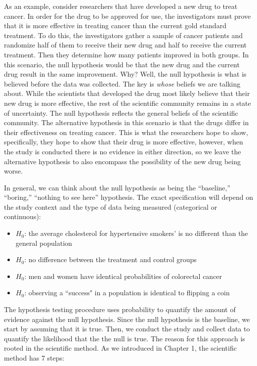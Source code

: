 \documentclass[
]{book}
\providecommand{\tightlist}{%
  \setlength{\itemsep}{0pt}\setlength{\parskip}{0pt}}
\theoremstyle{definition}
\theoremstyle{definition}
\theoremstyle{definition}
\theoremstyle{remark}
\begin{document}
As an example, consider researchers that have developed a new drug to treat cancer. In order for the drug to be approved for use, the investigators must prove that it is more effective in treating cancer than the current gold standard treatment. To do this, the investigators gather a sample of cancer patients and randomize half of them to receive their new drug and half to receive the current treatment. Then they determine how many patients improved in both groups. In this scenario, the null hypothesis would be that the new drug and the current drug result in the same improvement. Why? Well, the null hypothesis is what is believed before the data was collected. The key is \emph{whose} beliefs we are talking about. While the scientists that developed the drug most likely believe that their new drug is more effective, the rest of the scientific community remains in a state of uncertainty. The null hypothesis reflects the general beliefs of the scientific community. The alternative hypothesis in this scenario is that the drugs differ in their effectiveness on treating cancer. This is what the researchers hope to show, specifically, they hope to show that their drug is more effective, however, when the study is conducted there is no evidence in either direction, so we leave the alternative hypothesis to also encompass the possibility of the new drug being worse.

In general, we can think about the null hypothesis as being the ``baseline,'' ``boring,'' ``nothing to see here'' hypothesis. The exact specification will depend on the study context and the type of data being measured (categorical or continuous):

\begin{itemize}
\tightlist
\item
  \(H_0\): the average cholesterol for hypertensive smokers' is no different than the general population
\item
  \(H_0\): no difference between the treatment and control groups
\item
  \(H_0\): men and women have identical probabilities of colorectal cancer
\item
  \(H_0\): observing a ``success" in a population is identical to flipping a coin
\end{itemize}

The hypothesis testing procedure uses probability to quantify the amount of evidence against the null hypothesis. Since the null hypothesis is the baseline, we start by assuming that it is true. Then, we conduct the study and collect data to quantify the likelihood that the the null is true. The reason for this approach is rooted in the scientific method. As we introduced in Chapter 1, the scientific method has 7 steps:
\end{document}
